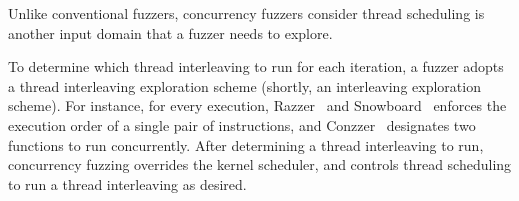 










%
Unlike conventional fuzzers, concurrency fuzzers consider thread
scheduling is another input domain that a fuzzer needs to explore.
%

To determine which thread interleaving to run for each iteration, a
fuzzer adopts a thread interleaving exploration scheme (shortly, an
interleaving exploration scheme).
%
For instance, for every execution, Razzer~\cite{razzer} and
Snowboard~\cite{snowboard} enforces the execution order of a single
pair of instructions,
and Conzzer~\cite{conzzer} designates two functions to
run concurrently.
%
After determining a thread interleaving to run, concurrency fuzzing
overrides the kernel scheduler, and controls thread scheduling to run
a thread interleaving as desired.



